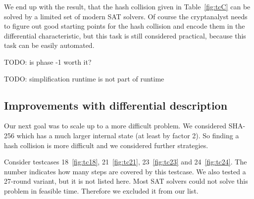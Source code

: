 We end up with the result, that the hash collision given in Table~\ref{fig:tcC}
can be solved by a limited set of modern SAT solvers. Of course the cryptanalyst
needs to figure out good starting points for the hash collision and encode them
in the differential characteristic, but this task is still considered practical,
because this task can be easily automated.

TODO: is phase -1 worth it?

TODO: simplification runtime is not part of runtime

\subsection{Improvements with differential description}
\label{sec:result-diff-desc}
%
Our next goal was to scale up to a more difficult problem. We considered SHA-256
which has a much larger internal state (at least by factor 2). So finding a hash
collision is more difficult and we considered further strategies.

Consider testcases 18~\ref{fig:tc18}, 21~\ref{fig:tc21}, 23~\ref{fig:tc23}
and 24~\ref{fig:tc24}. The number indicates how many steps are covered by this
testcase. We also tested a 27-round variant, but it is not listed here.
Most SAT solvers could not solve this problem in feasible time. Therefore we
excluded it from our list.

